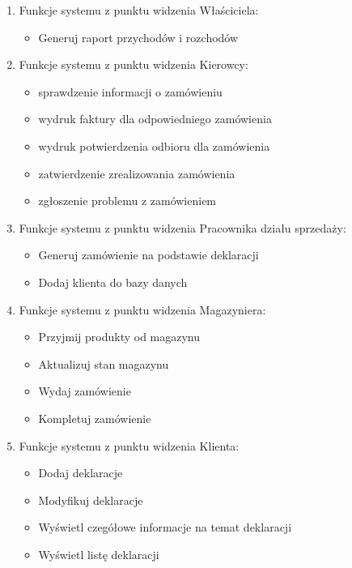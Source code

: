 
\begin{enumerate}
\item Funkcje systemu z punktu widzenia Właściciela:
	\begin{itemize}
		\item Generuj raport przychodów i rozchodów
	\end{itemize}

\item Funkcje systemu z punktu widzenia Kierowcy:
	\begin{itemize}
		\item sprawdzenie informacji o zamówieniu
		\item wydruk faktury dla odpowiedniego zamówienia
		\item wydruk potwierdzenia odbioru dla zamówienia
		\item zatwierdzenie zrealizowania zamówienia
		\item zgłoszenie problemu z zamówieniem
	\end{itemize}

\item Funkcje systemu z punktu widzenia Pracownika działu sprzedaży:
	\begin{itemize}
		\item Generuj zamówienie na podstawie deklaracji
		\item Dodaj klienta do bazy danych
	\end{itemize} 

\item Funkcje systemu z punktu widzenia Magazyniera:
	\begin{itemize}
		\item Przyjmij produkty od magazynu 
		\item Aktualizuj stan magazynu
		\item Wydaj zamówienie
		\item Kompletuj zamówienie
	\end{itemize}

\item Funkcje systemu z punktu widzenia Klienta:
	\begin{itemize}
		\item Dodaj deklaracje
		\item Modyfikuj deklaracje
		\item Wyświetl czegółowe informacje na temat deklaracji
		\item Wyświetl listę deklaracji
	\end{itemize}


\end{enumerate}
